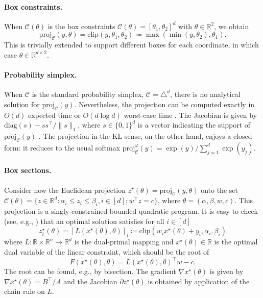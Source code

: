 \documentclass{article}
\def\cC{{\mathcal{C}}}
\def\RR{{\mathbb R}}
\def\proj{{\text{proj}}}
\begin{document}
\paragraph{Box constraints.}

When $\cC(\theta)$ is the box constraints $\cC(\theta) = [\theta_1, \theta_2]^d$ 
with $\theta \in \RR^2$, we obtain
\begin{equation}
\proj_{\cC}(y, \theta) = \text{clip}(y, \theta_1, \theta_2) \coloneqq
\max( \min(y, \theta_2), \theta_1).
\end{equation}
This is trivially extended to support different boxes for each coordinate, 
in which case $\theta \in \RR^{d \times 2}$.

\paragraph{Probability simplex.}

When $\cC$ is the standard probability simplex,
$\cC = \triangle^d$, there is no analytical solution for $\proj_\cC(y)$. 
Nevertheless, the projection can be computed exactly in $O(d)$ expected
time or $O(d \log d)$ worst-case time
\cite{Brucker1984,michelot,duchi,Condat2016}.
The Jacobian is given by $\text{diag}(s) - s s^\top / \|s\|_1$, 
where $s \in \{0,1\}^d$ is a vector indicating the support of $\proj_\cC(y)$
\cite{sparsemax}. The projection in the KL sense, on the other hand, enjoys a
closed form: it reduces to the usual softmax
$\proj^\varphi_\cC(y) = \exp(y) / \sum_{j=1}^d \exp(y_j)$.

\paragraph{Box sections.}

Consider now the Euclidean projection 
$z^\star(\theta) = \proj_{\cC}(y, \theta)$ onto the set 
$\cC(\theta) = \{z \in \RR^d \colon \alpha_i \le z_i \le \beta_i, i \in
[d]; w^\top z = c\}$, where $\theta = (\alpha, \beta, w, c)$.
This projection is a singly-constrained bounded quadratic program.
It is easy to check (see, e.g., \cite{lp_sparsemap}) that an optimal solution
satisfies for all $i \in [d]$
\begin{equation}
z^\star_i(\theta) = [L(x^\star(\theta), \theta)]_i
\coloneqq \text{clip}(w_i x^\star(\theta) + y_i, \alpha_i, \beta_i)
\end{equation}
where $L \colon \RR \times \RR^n \to \RR^d$ is the dual-primal mapping
and $x^\star(\theta) \in \RR$ is the optimal dual variable of the linear
constraint, which should be the root of
\begin{equation}
F(x^\star(\theta), \theta) = L(x^\star(\theta), \theta)^\top w - c.
\end{equation}
The root can be found, e.g., by bisection.
The gradient $\nabla x^\star(\theta)$ is given by
$\nabla x^\star(\theta) = B^\top / A$
and the Jacobian $\partial z^\star(\theta)$ is
obtained by application of the chain rule on $L$.
\end{document}
